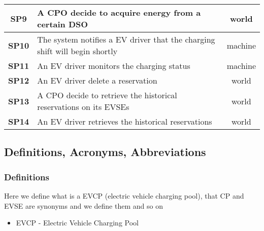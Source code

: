 \begin{table}[H]
\begin{tabularx}{\textwidth}{c|X|c}
        \textbf{SP9}  & A CPO decide to acquire energy from a certain DSO                                                                                                                     & world         \\ \midrule
        \textbf{SP10} & The system notifies a EV driver that the charging shift will begin shortly                                                                                            & machine       \\ \midrule
        \textbf{SP11} & An EV driver monitors the charging status                                                                                                                             & machine       \\ \midrule
        \textbf{SP12} & An EV driver delete a reservation                                                                                                                                     & world         \\ \midrule
        \textbf{SP13} & A CPO decide to retrieve the historical reservations on its EVSEs                                                                                                     & world         \\ \midrule
        \textbf{SP14} & An EV driver retrieves the historical reservations                                                                                                                    & world         \\ \bottomrule
    \end{tabularx}
\end{table}


\subsection{Definitions, Acronyms, Abbreviations}
\subsubsection*{Definitions}
Here we define what is a EVCP (electric vehicle charging pool), that CP and EVSE are synonyms and we define them and so on
\begin{itemize}
    \item EVCP - Electric Vehicle Charging Pool
\end{itemize}
